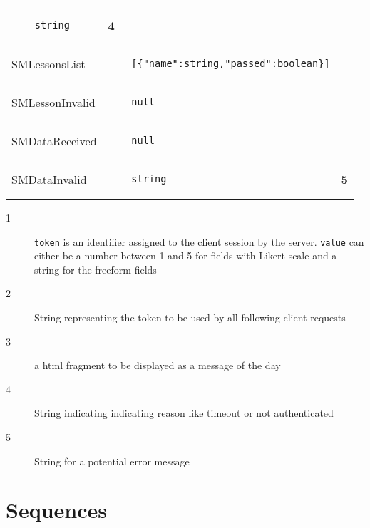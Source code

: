 \documentclass{scrartcl}
\begin{document}
\begin{tabular}{lll}
\begin{lstlisting}
    string
  \end{lstlisting} & {\bfseries\footnotesize 4} \\
  SMLessonsList &
  \begin{lstlisting}
    [{"name":string,"passed":boolean}]
  \end{lstlisting} \\
  SMLessonInvalid &
  \begin{lstlisting}
    null
  \end{lstlisting} \\
  SMDataReceived &
  \begin{lstlisting}
    null
  \end{lstlisting} \\
  SMDataInvalid &
  \begin{lstlisting}
    string
  \end{lstlisting} & {\bfseries\footnotesize 5} \\
\end{tabular}

\begin{description}
\item[{\footnotesize 1}] \texttt{token} is an identifier assigned to the client session by the server. \texttt{value} can either be a number between 1 and 5 for fields with Likert scale and a string for the freeform fields
\item[{\footnotesize 2}] String representing the token to be used by all following client requests
\item[{\footnotesize 3}] a html fragment to be displayed as a message of the day
\item[{\footnotesize 4}] String indicating indicating reason like timeout or not authenticated
\item[{\footnotesize 5}] String for a potential error message
\end{description}
\section{Sequences}
\end{document}
